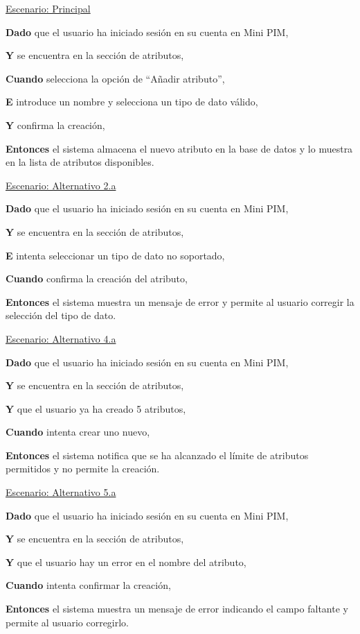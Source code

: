 \underline{Escenario: Principal}\par
\vspace{0.15cm}
\textbf{Dado} que el usuario ha iniciado sesión en su cuenta en Mini PIM,\par
\textbf{Y} se encuentra en la sección de atributos,\par
\textbf{Cuando} selecciona la opción de \enquote{Añadir atributo},\par
\textbf{E} introduce un nombre y selecciona un tipo de dato válido,\par
\textbf{Y} confirma la creación,\par
\textbf{Entonces} el sistema almacena el nuevo atributo en la base de datos y lo muestra en la lista de atributos disponibles.\par
\vspace{0.20cm}

\underline{Escenario: Alternativo 2.a}\par
\vspace{0.15cm}
\textbf{Dado} que el usuario ha iniciado sesión en su cuenta en Mini PIM,\par
\textbf{Y} se encuentra en la sección de atributos,\par
\textbf{E} intenta seleccionar un tipo de dato no soportado,\par
\textbf{Cuando} confirma la creación del atributo,\par
\textbf{Entonces} el sistema muestra un mensaje de error y permite al usuario corregir la selección del tipo de dato.\par
\vspace{0.20cm}

\underline{Escenario: Alternativo 4.a}\par
\vspace{0.15cm}
\textbf{Dado} que el usuario ha iniciado sesión en su cuenta en Mini PIM,\par
\textbf{Y} se encuentra en la sección de atributos,\par
\textbf{Y} que el usuario ya ha creado 5 atributos,\par
\textbf{Cuando} intenta crear uno nuevo,\par
\textbf{Entonces} el sistema notifica que se ha alcanzado el límite de atributos permitidos y no permite la creación.\par
\vspace{0.20cm}

\underline{Escenario: Alternativo 5.a}\par
\vspace{0.15cm}
\textbf{Dado} que el usuario ha iniciado sesión en su cuenta en Mini PIM,\par
\textbf{Y} se encuentra en la sección de atributos,\par
\textbf{Y} que el usuario hay un error en el nombre del atributo,\par
\textbf{Cuando} intenta confirmar la creación,\par
\textbf{Entonces} el sistema muestra un mensaje de error indicando el campo faltante y permite al usuario corregirlo.\par
\vspace{0.20cm}


